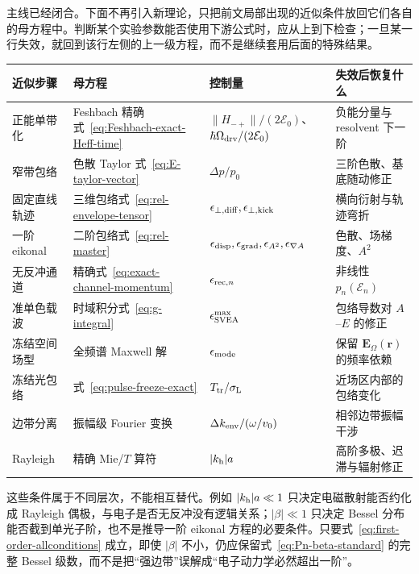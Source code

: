 主线已经闭合。下面不再引入新理论，只把前文局部出现的近似条件放回它们各自的母方程中。判断某个实验参数能否使用下游公式时，应从上到下检查；一旦某一行失效，就回到该行左侧的上一级方程，而不是继续套用后面的特殊结果。

\begin{center}
\small
\begin{tabularx}{\textwidth}{>{\raggedright\arraybackslash}p{}>{\raggedright\arraybackslash}X>{\raggedright\arraybackslash}p{}>{\raggedright\arraybackslash}X}
\hline
近似步骤 & 母方程 & 控制量 & 失效后恢复什么\\
\hline
正能单带化
& Feshbach 精确式~\eqref{eq:Feshbach-exact-Heff-time}
& $\|H_{-+}\|/(2\mathcal E_0)$、$\hbar\Omega_{\rm drv}/(2\mathcal E_0)$
& 负能分量与 resolvent 下一阶\\
窄带包络
& 色散 Taylor 式~\eqref{eq:E-taylor-vector}
& $\Delta p/p_0$
& 三阶色散、基底随动修正\\
固定直线轨迹
& 三维包络式~\eqref{eq:rel-envelope-tensor}
& $\epsilon_{\perp,{\rm diff}},\epsilon_{\perp,{\rm kick}}$
& 横向衍射与轨迹弯折\\
一阶 eikonal
& 二阶包络式~\eqref{eq:rel-master}
& $\epsilon_{\rm disp},\epsilon_{\rm grad},\epsilon_{A^2},\epsilon_{\nabla A}$
& 色散、场梯度、$A^2$\\
无反冲通道
& 精确式~\eqref{eq:exact-channel-momentum}
& $\epsilon_{{\rm rec},n}$
& 非线性 $p_n(\mathcal E_n)$\\
准单色载波
& 时域积分式~\eqref{eq:g-integral}
& $\epsilon_{\rm SVEA}^{\max}$
& 包络导数对 $A$--$E$ 的修正\\
冻结空间场型
& 全频谱 Maxwell 解
& $\epsilon_{\rm mode}$
& 保留 $\bm E_{\Omega}(\bm r)$ 的频率依赖\\
冻结光包络
& 式~\eqref{eq:pulse-freeze-exact}
& $T_{\rm tr}/\sigma_{\rm L}$
& 近场区内部的包络变化\\
边带分离
& 振幅级 Fourier 变换
& $\Delta k_{\rm env}/(\omega/v_0)$
& 相邻边带振幅干涉\\
Rayleigh
& 精确 Mie/$T$ 算符
& $|k_{\rm h}|a$
& 高阶多极、迟滞与辐射修正\\
\hline
\end{tabularx}
\end{center}

这些条件属于不同层次，不能相互替代。例如 $|k_{\rm h}|a\ll1$ 只决定电磁散射能否约化成 Rayleigh 偶极，与电子是否无反冲没有逻辑关系；$|\beta|\ll1$ 只决定 Bessel 分布能否截到单光子阶，也不是推导一阶 eikonal 方程的必要条件。只要式~\eqref{eq:first-order-allconditions} 成立，即使 $|\beta|$ 不小，仍应保留式~\eqref{eq:Pn-beta-standard} 的完整 Bessel 级数，而不是把“强边带”误解成“电子动力学必然超出一阶”。


